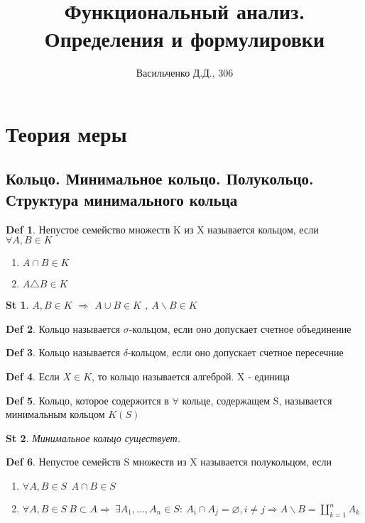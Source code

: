 \documentclass[14pt]{article}
\author{Васильченко Д.Д., 306}
\title{Функциональный анализ. Определения и формулировки}
\theoremstyle{plain}
\newtheorem{St}{St}
\theoremstyle{definition}
\newtheorem{Def}{Def}
\begin{document}
	\maketitle
	\section{Теория меры}
		\subsection{Кольцо. Минимальное кольцо. Полукольцо. Структура минимального кольца}
			\begin{Def}
				Непустое семейство множеств K из X называется кольцом, если $\forall A, B \in K$ 
				\begin{enumerate}
					\item $A \cap B \in K$
					\item $A \triangle B \in K$
				\end{enumerate}
			\end{Def}
			\begin{St}
				$A, B \in K$ $\Rightarrow$ $A \cup B \in K$ , $A \backslash  B \in K$
			\end{St}
			\begin{Def}
	 			Кольцо называется $\sigma$-кольцом, если оно допускает счетное объединение
			\end{Def}
			\begin{Def}
				Кольцо называется $\delta$-кольцом, если оно допускает счетное пересечние
			\end{Def}
			\begin{Def}
				Если $X \in K$, то кольцо называется алгеброй. X - единица
			\end{Def}
			\begin{Def}
				Кольцо, которое содержится в $\forall$ кольце, содержащем S, называется минимальным кольцом $K(S)$
			\end{Def}
			\begin{St}
				Минимальное кольцо существует.
			\end{St}
			\begin{Def}
				Непустое семейств S множеств из X называется полукольцом, если
				\begin{enumerate}
					\item $\forall A, B \in S \ \ A \cap B \in S$
					\item $\forall A, B \in S \ B \subset A \Rightarrow \ \exists A_1, \dots, A_n \in S : \ A_i \cap A_j = \varnothing, i \neq j \Rightarrow A \backslash B = \coprod\limits_{k=1}^{n} A_k $
				\end{enumerate}
			\end{Def}
\end{document}
